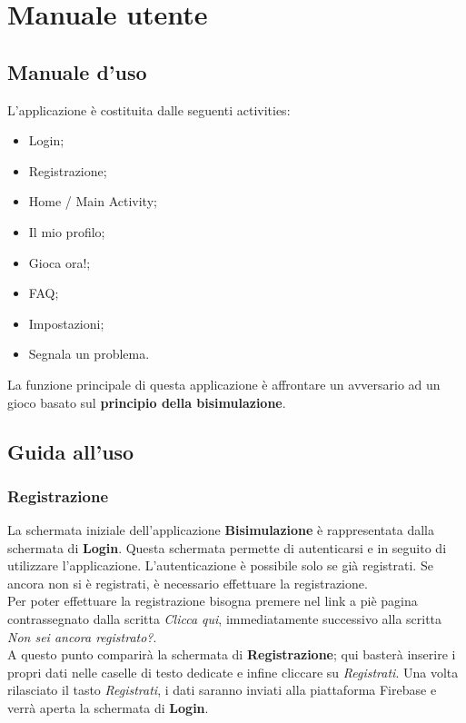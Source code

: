 \documentclass[a4paper,12pt,twoside,openright]{report}
\begin{document}
\chapter{Manuale utente}
\section{Manuale d'uso}
L'applicazione è costituita dalle seguenti activities:

\begin{itemize}
\item Login;

\item Registrazione;

\item Home / Main Activity;

\item Il mio profilo;

\item Gioca ora!;

\item FAQ;

\item Impostazioni;

\item Segnala un problema.
\end{itemize}

La funzione principale di questa applicazione è affrontare un avversario ad un gioco basato sul \textbf{principio della bisimulazione}. 

\section{Guida all'uso}
\subsection{Registrazione}
La schermata iniziale dell'applicazione \textbf{Bisimulazione} è rappresentata dalla schermata di \textbf{Login}. Questa schermata permette di autenticarsi e in 
seguito di utilizzare l'applicazione. L'autenticazione è possibile solo se già registrati. Se ancora non si è registrati, è necessario effettuare la registrazione.\\
Per poter effettuare la registrazione bisogna premere nel link a piè pagina contrassegnato dalla scritta \textit{Clicca qui}, immediatamente successivo
alla scritta \textit{Non sei ancora registrato?}.\\
A questo punto comparirà la schermata di \textbf{Registrazione}; qui basterà inserire i propri dati nelle caselle di testo dedicate e infine cliccare su \textit{Registrati}.
Una volta rilasciato il tasto \textit{Registrati}, i dati saranno inviati alla piattaforma Firebase e verrà aperta la schermata di \textbf{Login}.
\end{document}
